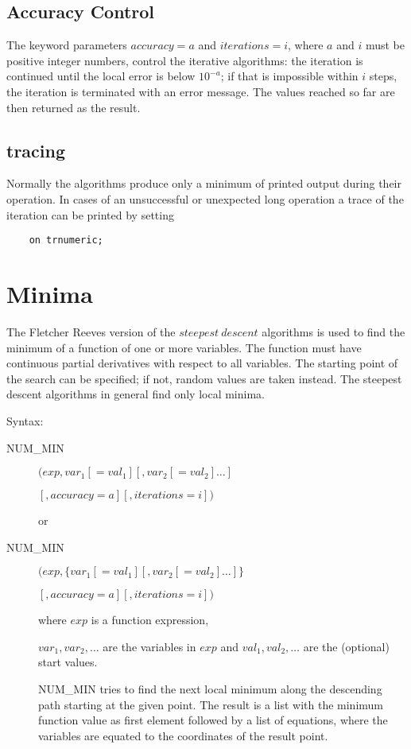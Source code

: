 \subsection{Accuracy Control}

The keyword parameters $accuracy=a$ and $iterations=i$, where
$a$ and $i$ must be positive integer numbers, control the
iterative algorithms: the iteration is continued until
the local error is below $10^{-a}$; if that is impossible
within $i$ steps, the iteration is terminated with an
error message. The values reached so far are then returned
as the result.

\subsection{tracing}

Normally the algorithms produce only a minimum of printed
output during their operation. In cases of an unsuccessful
or unexpected long operation a trace of the iteration can be
printed by setting

\begin{verbatim}
    on trnumeric;
\end{verbatim}


\section{Minima}

The Fletcher Reeves version of the $steepest\ descent$
algorithms is used to find the minimum of a
function of one or more variables. The
function must have continuous partial derivatives with respect to all
variables. The starting point of the search can be
specified; if not, random values are taken instead.
The steepest descent algorithms in general find only local
minima.

Syntax:

\begin{description}
\item[NUM\_MIN] $(exp, var_1[=val_1] [,var_2[=val_2] \ldots]$

$             [,accuracy=a][,iterations=i]) $

or

\item[NUM\_MIN] $(exp, \{ var_1[=val_1] [,var_2[=val_2] \ldots] \}$

$             [,accuracy=a][,iterations=i]) $


where $exp$ is a function expression,

$var_1, var_2, \ldots$ are the variables in $exp$ and
$val_1,val_2, \ldots$ are the (optional) start values.

NUM\_MIN tries to find the next local minimum along the descending
path starting at the given point. The result is a list
with the minimum function value as first element followed by a list
of equations, where the variables are equated to the coordinates
of the result point.
\end{description}

